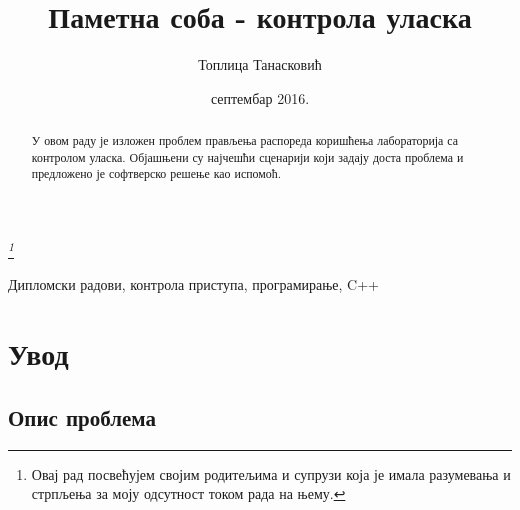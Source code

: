 \documentclass[a4paper, 12pt, diplomski]{etfcyr}
\title{Паметна соба - контрола уласка}
\author{Топлица Танасковић}
\date{септембар 2016.}
\begin{document}
	\sloppy
	\maketitle

	\thispagestyle{empty}
	\vspace*{\fill}
	\begin{center}
			\textit{\thanks{Овај рад посвећујем својим родитељима и супрузи која је имала разумевања и стрпљења за моју одсутност током рада на њему.}}
	\end{center}
	\vspace*{\fill}

	\begin{abstract}
		\begin{justify}
			У овом раду је изложен проблем прављења распореда коришћења лабораторија са контролом уласка. Објашњени су најчешћи сценарији који задају доста проблема и предложено је софтверско решење као испомоћ.
		\end{justify}
	\end{abstract}

	\begin{keywords}
		Дипломски радови, контрола приступа, програмирање, C++
	\end{keywords}
	\tableofcontents
	\listoffigures
	\listoftables
	\lstlistoflistings

	\chapter{Увод}

		\section{Опис проблема}
\end{document}
